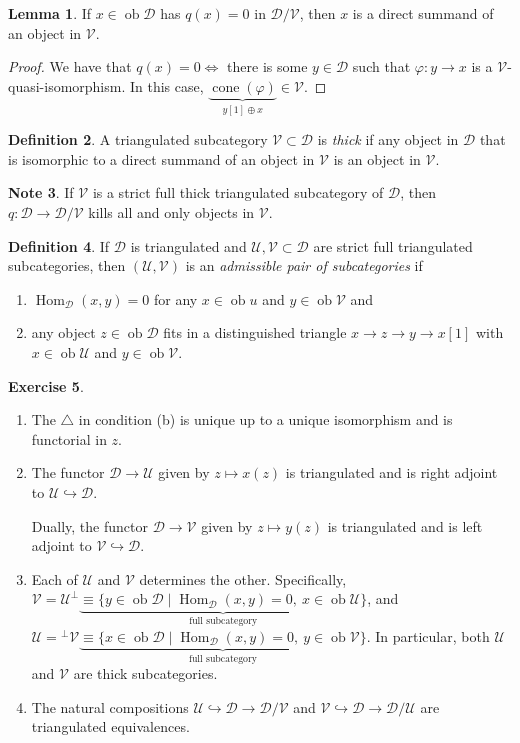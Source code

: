 \documentclass[10pt,letterpaper,cm]{nupset}
\theoremstyle{definition}
\newtheorem{definition}{Definition}[subsection]
\newtheorem{note}[definition]{Note}
\theoremstyle{theorem}
\newtheorem{lemma}[definition]{Lemma}
\newtheorem{exercise}[definition]{Exercise}
\theoremstyle{remark}
\newcommand{\1}{\mathbf{1}}
\renewcommand{\d}{\mathscr{D}}
\renewcommand{\u}{\mathscr{U}}
\renewcommand{\v}{\mathscr{V}}
\newcommand{\0}{\vec 0}
\DeclareMathOperator{\ob}{ob}
\DeclareMathOperator{\Hom}{Hom}
\DeclareMathOperator{\cone}{cone}
\begin{document}
\begin{lemma}
If $x \in \ob{\d}$ has $q(x) = 0$ in $\d/\v$, then $x$ is a direct summand of an object in $\v$.
\end{lemma}
\begin{proof}
We have that $q(x) =0 \iff$ there is some $y\in \d$ such that $\varphi : y \to x$ is a $\v$-quasi-isomorphism. In this case, $\underbrace{\cone(\varphi)}_{y[1] \oplus x} \in \v$.
\end{proof}

\begin{definition}
A triangulated subcategory $\v \subset \d$ is \textit{thick} if any object in $\d$ that is isomorphic to a direct summand of an object in $\v$ is an object in $\v$. 
\end{definition}

\begin{note}
If $\v$ is a strict full thick triangulated subcategory	 of $\d$, then $q : \d \to \d/\v$ kills all and only objects in $\v$. 
\end{note}

\begin{definition}
If $\d$ is triangulated and $\u, \v \subset \d$ are strict full triangulated subcategories, then $(\u, \v)$ is an \textit{admissible pair of subcategories} if 
\begin{enumerate}[label=(\alph*)]
\item $\Hom_{\d}(x,y) =0$ for any $x \in \ob{u}$ and $y \in \ob{\v}$ and
\item any object $z \in \ob{\d}$ fits in a distinguished triangle $x \to z \to y \to x[1]$ with $x \in \ob{\u}$ and $y \in \ob{\v}$. 
\end{enumerate}
\end{definition}

\begin{exercise} $ $
\begin{enumerate}
\item The $\triangle$ in condition (b) is unique up to a unique isomorphism and is functorial in $z$.
\item The functor $\d \to \u$ given by $z \mapsto x(z)$ is triangulated and is right adjoint to $\u \hookrightarrow \d$. 

Dually, the functor $\d \to \v$ given by $z \mapsto y(z)$ is triangulated and is left adjoint to $\v \hookrightarrow \d$.
\item Each of $\u$ and $\v$ determines the other. Specifically, $\v = \u^{\perp} \underbrace{\equiv \{y \in \ob{\d} \mid \Hom_{\d}(x,y) = 0, \ x \in \ob{\u}\}}_{\text{full subcategory}}$, and $\u = {^{\perp}{\v}} \underbrace{\equiv \{x \in \ob{\d} \mid \Hom_{\d}(x,y) =0, \ y \in \ob{\v}\}}_{\text{full subcategory}}$. In particular, both $\u$ and $\v$ are thick subcategories. 
\item The natural compositions $\u \hookrightarrow \d \to \d/\v$ and $\v \hookrightarrow \d \to \d/\u$ are triangulated equivalences. 
\end{enumerate}
\end{exercise}
\end{document}
